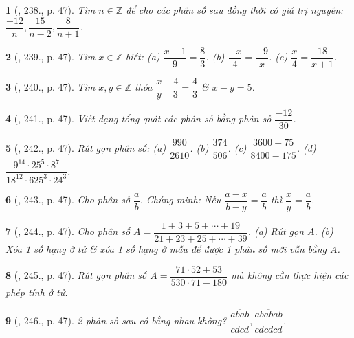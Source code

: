 \documentclass{article}
\newtheorem{baitoan}{}
\begin{document}
\begin{baitoan}[\cite{Tuyen_Toan_6}, 238., p. 47]
	Tìm $n\in\mathbb{Z}$ để cho các phân số sau đồng thời có giá trị nguyên: $\dfrac{-12}{n},\dfrac{15}{n - 2},\dfrac{8}{n + 1}$.
\end{baitoan}

\begin{baitoan}[\cite{Tuyen_Toan_6}, 239., p. 47]
	Tìm $x\in\mathbb{Z}$ biết: (a) $\dfrac{x - 1}{9} = \dfrac{8}{3}$. (b) $\dfrac{-x}{4} = \dfrac{-9}{x}$. (c) $\dfrac{x}{4} = \dfrac{18}{x + 1}$.
\end{baitoan}

\begin{baitoan}[\cite{Tuyen_Toan_6}, 240., p. 47]
	Tìm $x,y\in\mathbb{Z}$ thỏa $\dfrac{x - 4}{y - 3} = \dfrac{4}{3}$ \& $x - y = 5$.
\end{baitoan}

\begin{baitoan}[\cite{Tuyen_Toan_6}, 241., p. 47]
	Viết dạng tổng quát các phân số bằng phân số $\dfrac{-12}{30}$.
\end{baitoan}

\begin{baitoan}[\cite{Tuyen_Toan_6}, 242., p. 47]
	Rút gọn phân số: (a) $\dfrac{990}{2610}$. (b) $\dfrac{374}{506}$. (c) $\dfrac{3600 - 75}{8400 - 175}$. (d) $\dfrac{9^{14}\cdot25^5\cdot8^7}{18^{12}\cdot625^3\cdot24^3}$.
\end{baitoan}

\begin{baitoan}[\cite{Tuyen_Toan_6}, 243., p. 47]
	Cho phân số $\dfrac{a}{b}$. Chứng minh: Nếu $\dfrac{a - x}{b - y} = \dfrac{a}{b}$ thì $\dfrac{x}{y} = \dfrac{a}{b}$.
\end{baitoan}

\begin{baitoan}[\cite{Tuyen_Toan_6}, 244., p. 47]
	Cho phân số $A = \dfrac{1 + 3 + 5 + \cdots + 19}{21 + 23 + 25 + \cdots + 39}$. (a) Rút gọn $A$. (b) Xóa 1 số hạng ở tử \& xóa 1 số hạng ở mẫu để được 1 phân số mới vẫn bằng $A$.
\end{baitoan}

\begin{baitoan}[\cite{Tuyen_Toan_6}, 245., p. 47]
	Rút gọn phân số $A = \dfrac{71\cdot52 + 53}{530\cdot71 - 180}$ mà không cần thực hiện các phép tính ở tử.
\end{baitoan}

\begin{baitoan}[\cite{Tuyen_Toan_6}, 246., p. 47]
	2 phân số sau có bằng nhau không? $\dfrac{\overline{abab}}{\overline{cdcd}},\dfrac{\overline{ababab}}{\overline{cdcdcd}}$.
\end{baitoan}
\end{document}
